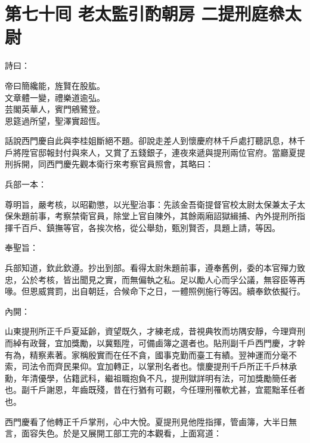 
\chapter*{第七十囘 老太監引酌朝房 二提刑庭叅太尉}


詩曰：

\begin{myquote} 
帝曰簡纔能，旌賢在股肱。\\文章體一變，禮樂道逾弘。\\芸閣英華人，賓門鵷鷺登。\\恩筵過所望，聖澤實超恆。
\end{myquote} 

話說西門慶自此與李桂姐斷絕不題。卻說走差人到懷慶府林千戶處打聽訊息，林千戶將陞官邸報封付與來人，又賞了五錢銀子，連夜來遞與提刑兩位官府。當廳夏提刑拆開，同西門慶先觀本衛行來考察官員照會，其略曰：

\begin{myquote}[\markfont]
兵部一本：

尊明旨，嚴考核，以昭勸懲，以光聖治事：先該金吾衛提督官校太尉太保兼太子太保朱題前事，考察禁衛官員，除堂上官自陳外，其餘兩廂詔獄緝捕、內外提刑所指揮千百戶、鎮撫等官，各挨次格，從公舉劾，甄別賢否，具題上請，等因。

奉聖旨：

兵部知道，欽此欽遵。抄出到部。看得太尉朱題前事，遵奉舊例，委的本官殫力致忠，公於考核，皆出聞見之實，而無偏執之私。足以勵人心而孚公議，無容臣等再喙。但恩威賞罰，出自朝廷，合候命下之日，一體照例施行等因。續奉欽依擬行。

內開：

山東提刑所正千戶夏延齡，資望既久，才練老成，昔視典牧而坊隅安靜，今理齊刑而綽有政聲，宜加獎勵，以冀甄陞，可備鹵簿之選者也。貼刑副千戶西門慶，才幹有為，精察素著。家稱殷實而在任不貪，國事克勤而臺工有績。翌神運而分毫不索，司法令而齊民果仰。宜加轉正，以掌刑名者也。懷慶提刑千戶所正千戶林承勳，年清優學，佔籍武科，繼祖職抱負不凡，提刑獄詳明有法，可加獎勵簡任者也。副千戶謝恩，年齒既殘，昔在行猶有可觀，今任理刑罹軟尤甚，宜罷黜革任者也。
\end{myquote} 

西門慶看了他轉正千戶掌刑，心中大悅。夏提刑見他陞指揮，管鹵簿，大半日無言，面容失色。於是又展開工部工完的本觀看，上面寫道：

